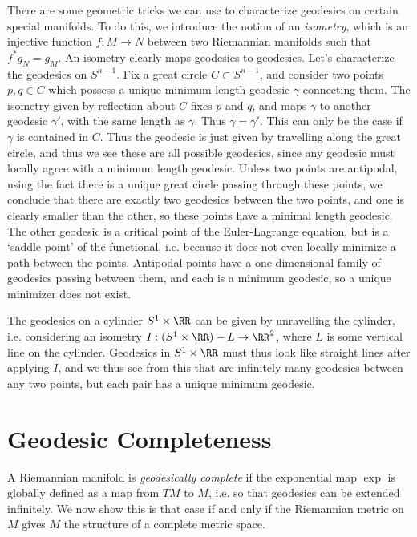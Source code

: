 There are some geometric tricks we can use to characterize geodesics on certain special manifolds. To do this, we introduce the notion of an \emph{isometry}, which is an injective function $f: M \to N$ between two Riemannian manifolds such that $f^* g_N = g_M$. An isometry clearly maps geodesics to geodesics. Let's characterize the geodesics on $S^{n-1}$. Fix a great circle $C \subset S^{n-1}$, and consider two points $p,q \in C$ which possess a unique minimum length geodesic $\gamma$ connecting them. The isometry given by reflection about $C$ fixes $p$ and $q$, and maps $\gamma$ to another geodesic $\gamma'$, with the same length as $\gamma$. Thus $\gamma = \gamma'$. This can only be the case if $\gamma$ is contained in $C$. Thus the geodesic is just given by travelling along the great circle, and thus we see these are all possible geodesics, since any geodesic must locally agree with a minimum length geodesic. Unless two points are antipodal, using the fact there is a unique great circle passing through these points, we conclude that there are exactly two geodesics between the two points, and one is clearly smaller than the other, so these points have a minimal length geodesic. The other geodesic is a critical point of the Euler-Lagrange equation, but is a `saddle point' of the functional, i.e. because it does not even locally minimize a path between the points. Antipodal points have a one-dimensional family of geodesics passing between them, and each is a minimum geodesic, so a unique minimizer does not exist.

The geodesics on a cylinder $S^1 \times \RR$ can be given by unravelling the cylinder, i.e. considering an isometry $I: (S^1 \times \RR) - L \to \RR^2$, where $L$ is some vertical line on the cylinder. Geodesics in $S^1 \times \RR$ must thus look like straight lines after applying $I$, and we thus see from this that are infinitely many geodesics between any two points, but each pair has a unique minimum geodesic.

\section{Geodesic Completeness}

A Riemannian manifold is \emph{geodesically complete} if the exponential map $\exp$ is globally defined as a map from $TM$ to $M$, i.e. so that geodesics can be extended infinitely. We now show this is that case if and only if the Riemannian metric on $M$ gives $M$ the structure of a complete metric space.

